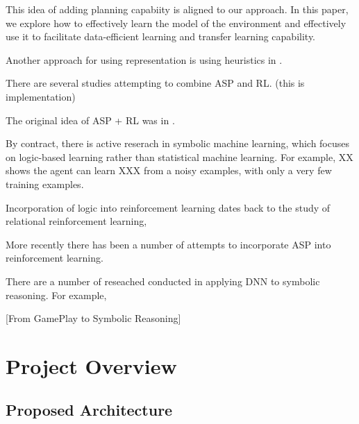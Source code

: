 \documentclass[12pt,twoside]{report}
\begin{document}
This idea of adding planning capabiity is aligned to our approach. In this paper, we explore how to effectively learn the model of the environment and effectively use it to facilitate data-efficient learning and transfer learning capability. 


%




Another approach for using representation is using heuristics in \cite{Apeldoorn2017}. 

There are several studies attempting to combine ASP and RL. \cite{Ferreira2017a} (this is implementation)

The original idea of ASP + RL was in \cite{Ferreira2017a}. 

By contract, there is active reserach in symbolic machine learning, which focuses on logic-based learning rather than statistical machine learning.
For example, XX shows the agent can learn XXX from a noisy examples, with only a very few training examples.

Incorporation of logic into reinforcement learning dates back to the study of relational reinforcement learning,


More recently there has been a number of attempts to incorporate ASP into reinforcement learning.

There are a number of reseached conducted in applying DNN to symbolic reasoning.
For example,

[From GamePlay to Symbolic Reasoning]


\chapter{Project Overview}
\label{project_overview}

\section{Proposed Architecture}
\label{proposed_architecture_section}
\end{document}
